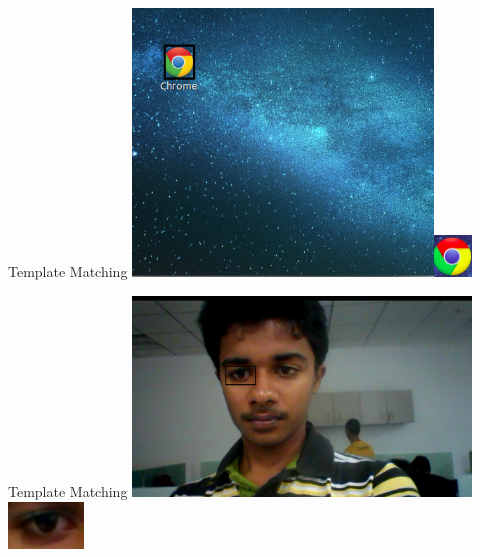 \documentclass{beamer}
\begin{document}
\begin{frame}{Template Matching}
    \centering
        \includegraphics[width=80mm]{images/temp_match.png}\includegraphics[width=10mm]{images/template2.png}

\end{frame}
\begin{frame}{Template Matching}
    \centering
    \includegraphics[width=90mm]{images/template_matching.png}\includegraphics[width=20mm]{images/template1.png}

\end{frame}
\end{document}
